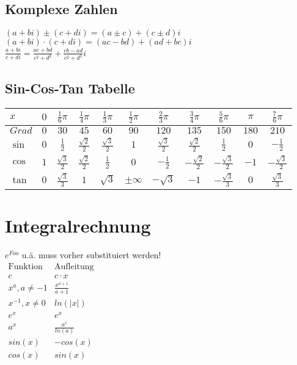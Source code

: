 \documentclass[a4paper, landscape, 10pt]{article}
\begin{document}
\begin{multicols}{4}
\begin{small}
        \subsection{Komplexe Zahlen}
        $(a + bi) \pm (c + di) = (a \pm c) + (c \pm d)i$\\
        $(a + bi) \cdot (c + di) = (ac - bd) + (ad + bc)i$\\
    
        $\displaystyle \frac{a + bi}{c + di} = \frac{ac + bd}{c^2 + d^2} + \frac{cb - ad}{c^2 + d^2}i$
	    \subsection{Sin-Cos-Tan Tabelle}
	    \begin{multicols}{2}
	    \begin{tabular}{l | c  c  c  c  c  c  c  c  c  c }
    	\noindent
    	$x$ & $0$ & $\frac{1}{6}\pi$ & $\frac{1}{4}\pi$ & $\frac{1}{3}\pi$ & $\frac{1}{2}\pi$ & $\frac{2}{3}\pi$ & $\frac{3}{4}\pi$ & $\frac{5}{6}\pi$ & $\pi$ & $\frac{7}{6}\pi$\\\hline
    	$Grad$ & $0$ & $30$ & $45$ & $60$ & $90$ & $120$ & $135$ & $150$ & $180$ & $210$\\\hline
    	$\sin$ & $0$ & $\frac{1}{2}$ & $\frac{\sqrt{2}}{2}$ & $\frac{\sqrt{3}}{2}$ & $1$ & $\frac{\sqrt{3}}{2}$ & $\frac{\sqrt{2}}{2}$ & $\frac{1}{2}$ & $0$ & $-\frac{1}{2}$\\\hline
    	$\cos$ & $1$ & $\frac{\sqrt{3}}{2}$ & $\frac{\sqrt{2}}{2}$ & $\frac{1}{2}$ & $0$ & $-\frac{1}{2}$ & $-\frac{\sqrt{2}}{2}$ & $-\frac{\sqrt{3}}{2}$ & $-1$ & $-\frac{\sqrt{3}}{2}$\\\hline
    	$\tan$ & $0$ & $\frac{\sqrt{3}}{3}$ & $1$ & $\sqrt{3}$ &$\pm\infty$ & $-\sqrt{3}$ & $-1$ & $-\frac{\sqrt{3}}{3}$ & $0$ & $\frac{\sqrt{3}}{3}$
    	\end{tabular}
        \end{multicols}
    \section{Integralrechnung}
        $e^{Foo}$ u.ä. muss vorher substituiert werden!\\
        
        $
        \begin{matrix}
        \text{Funktion} & \text{Aufleitung} \\
        c & c \cdot x \\
        x^a, a \neq -1 & \frac{x^{a+1}}{a+1}\\
        x^{-1}, x \neq 0 & ln(|x|)\\
        e^x & e^x \\
        a^x & \frac{a^x}{ln(a)} \\
        sin(x) & -cos(x)\\
        cos(x) & sin(x)
        \end{matrix}
        $

\end{small}
\end{multicols}
\end{document}
